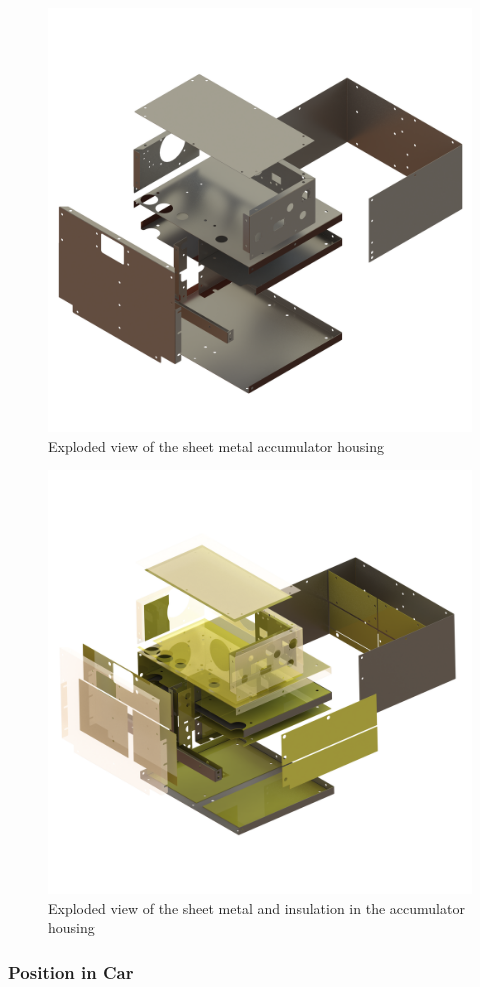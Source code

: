 \documentclass{article}
\begin{document}

            \begin{figure}[H]
                \centering
                \includegraphics[width = 0.5 \textwidth]{sheetmetal_isoview}
                \caption{Exploded view of the sheet metal accumulator housing}
                \label{cellcut}
            \end{figure}

            \begin{figure}[H]
                \centering
                \includegraphics[width = 0.5 \textwidth]{accumulator_insulation_frame_isoview}
                \caption{Exploded view of the sheet metal and insulation in the accumulator housing}
                \label{cellexp}
            \end{figure}

        \subsubsection{Position in Car}
\end{document}
